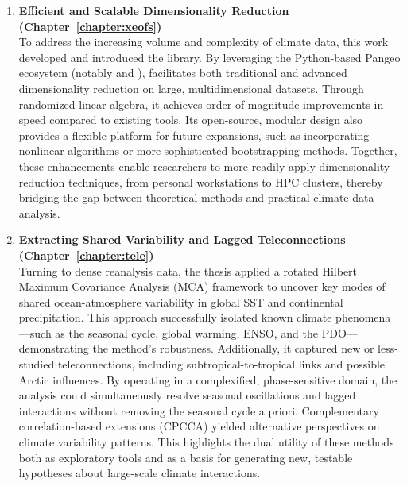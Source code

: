 \begin{enumerate}
    \item \textbf{Efficient and Scalable Dimensionality Reduction (Chapter~\ref{chapter:xeofs})}\\To address the increasing volume and complexity of climate data, this work developed and introduced the  library. By leveraging the Python-based Pangeo ecosystem (notably  and ),  facilitates both traditional and advanced dimensionality reduction on large, multidimensional datasets. Through randomized linear algebra, it achieves order-of-magnitude improvements in speed compared to existing tools. Its open-source, modular design also provides a flexible platform for future expansions, such as incorporating nonlinear algorithms or more sophisticated bootstrapping methods. Together, these enhancements enable researchers to more readily apply dimensionality reduction techniques, from personal workstations to HPC clusters, thereby bridging the gap between theoretical methods and practical climate data analysis.
    \item \textbf{Extracting Shared Variability and Lagged Teleconnections (Chapter~\ref{chapter:tele})}\\Turning to dense reanalysis data, the thesis applied a rotated Hilbert Maximum Covariance Analysis (MCA) framework to uncover key modes of shared ocean-atmosphere variability in global SST and continental precipitation. This approach successfully isolated known climate phenomena---such as the seasonal cycle, global warming, ENSO, and the PDO---demonstrating the method's robustness. Additionally, it captured new or less-studied teleconnections, including subtropical-to-tropical links and possible Arctic influences. By operating in a complexified, phase-sensitive domain, the analysis could simultaneously resolve seasonal oscillations and lagged interactions without removing the seasonal cycle a priori. Complementary correlation-based extensions (CPCCA) yielded alternative perspectives on climate variability patterns. This highlights the dual utility of these methods both as exploratory tools and as a basis for generating new, testable hypotheses about large-scale climate interactions.

\end{enumerate}
